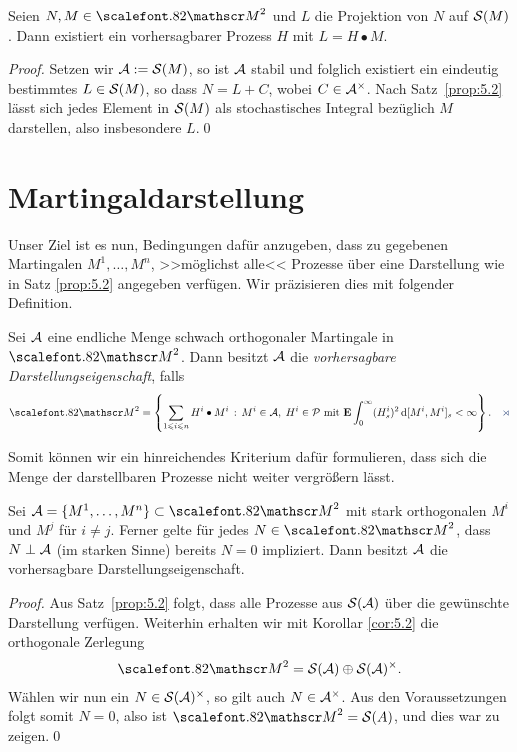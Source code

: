 \begin{korollar}
\label{cor:5.2}
  Seien $N,M\in\MM^2$ und $L$ die Projektion von $N$ auf $\SS(M)$. Dann
  existiert ein vorhersagbarer Prozess $H$ mit $L=H\bullet M$.
\end{korollar}
\begin{proof}
Setzen wir $\AA\defl \SS(M)$, so ist $\AA$ stabil und folglich existiert ein
eindeutig bestimmtes $L\in\SS(M)$, so dass $N = L + C$, wobei $C\in\AA^\times$.
Nach Satz~\ref{prop:5.2} lässt sich jedes Element in $\SS(M)$ als stochastisches
Integral bezüglich $M$ darstellen, also insbesondere $L$.\qed
\end{proof}

\section{Martingaldarstellung}

Unser Ziel ist es nun, Bedingungen dafür anzugeben, dass zu gegebenen
Martingalen $M^1,\ldots,M^n$, >>möglichst alle<< Prozesse über eine
Darstellung wie in Satz \ref{prop:5.2} angegeben verfügen. Wir präzisieren dies
mit folgender Definition.

\begin{definition}
Sei $\AA$ eine endliche Menge schwach orthogonaler Martingale in
$\MM^2$. Dann besitzt $\AA$ die \emph{vorhersagbare Darstellungseigenschaft},
falls
\begin{align*}
\MM^2 =
\setdef*{\sum_{1\le i\le n} H^i \bullet M^i}{M^i\in\AA,\; H^i\in\PP \text{
 mit } \E \int_0^\infty (H^i_s)^2 \, \diffd[M^i,M^i]_s < \infty}.\fish
\end{align*}
\end{definition}

Somit können wir ein hinreichendes Kriterium dafür formulieren, dass sich die
Menge der darstellbaren Prozesse nicht weiter vergrößern lässt.

\begin{korollar}
\label{cor:5.3}
Sei $\AA = \setd{ M^1,\ldots,M^n } \subset \MM^2$ mit stark orthogonalen $M^i$
und $M^j$ für $i\neq j$. Ferner gelte für jedes $N \in \MM^2$, dass $N \perp
\AA$ (im starken Sinne) bereits $N=0$ impliziert. Dann besitzt $\AA$ die
vorhersagbare Darstellungseigenschaft.\fish
\end{korollar}
\begin{proof}
Aus Satz~\ref{prop:5.2} folgt, dass alle Prozesse aus $\SS(\AA)$
über die gewünschte Darstellung verfügen. Weiterhin erhalten wir mit Korollar
\ref{cor:5.2} die orthogonale Zerlegung
\begin{align*}
\MM^2 = \SS(\AA)\oplus \SS(\AA)^\times.
\end{align*}
Wählen wir nun ein $N\in\SS(\AA)^\times$, so gilt auch
$N\in\AA^\times$. Aus den Voraussetzungen folgt somit $N= 0$, also ist $\MM^2 =
\SS(A)$, und dies war zu zeigen.\qed
\end{proof}

